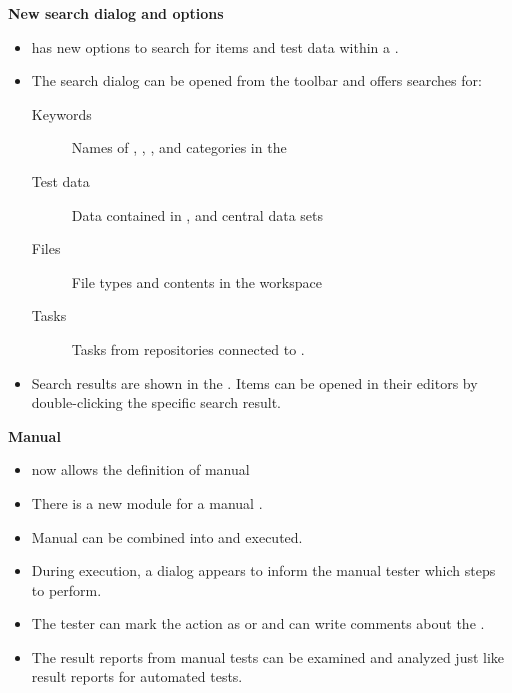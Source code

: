 \documentclass[en,a4paper,twoside,manual,guidancer]{bxreport}
\begin{document}
\textbf{New search dialog and options}
\begin{itemize}
\item \gd{} has new options to search for items and test data within a \gdproject{}.
\item The search dialog can be opened from the toolbar and offers searches for:
\begin{description}
\item [Keywords]{Names of \gdsteps{}, \gdcases{}, \gdsuites{}, \gdjobs{} and categories in the \gdproject{}}
\item [Test data]{Data contained in \gdcases{}, \gdsteps{} and central data sets}
\item [Files]{File types and contents in the workspace}
\item [Tasks]{Tasks from repositories connected to \gd{}.}
\end{description}
\item Search results are shown in the \gdsearchresultview{}. Items can be opened in their editors by double-clicking the specific search result. 
\end{itemize}

\textbf{Manual \gdsteps{}}
\begin{itemize}
\item \gd{} now allows the definition of manual \gdcases{}
\item There is a new module for a manual \gdstep{}.
\item Manual \gdcases{} can be combined into \gdsuites{} and executed.
\item During execution, a dialog appears to inform the manual tester which steps to perform.
\item The tester can mark the action as  or  and can write comments about the \gdstep{}.
\item The result reports from manual tests can be examined and analyzed just like result reports for automated tests.
\end{itemize}
\end{document}
